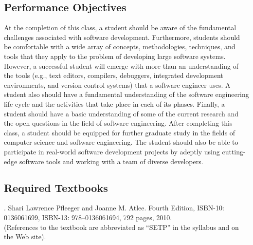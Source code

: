 \documentclass[11pt]{article}
\begin{document}
\subsection*{Performance Objectives}

At the completion of this class, a student should be aware of the fundamental challenges associated with software
development. Furthermore, students should be comfortable with a wide array of concepts, methodologies, techniques, and
tools that they apply to the problem of developing large software systems. However, a successful student will emerge
with more than an understanding of the tools (e.g., text editors, compilers, debuggers, integrated development
environments, and version control systems) that a software engineer uses. A student also should have a fundamental
understanding of the software engineering life cycle and the activities that take place in each of its phases. Finally,
a student should have a basic understanding of some of the current research and the open questions in the field of
software engineering. After completing this class, a student should be equipped for further graduate study in the fields
of computer science and software engineering. The student should also be able to participate in real-world software
development projects by adeptly using cutting-edge software tools and working with a team of diverse developers.

\subsection*{Required Textbooks}


. Shari Lawrence Pfleeger and Joanne M. Atlee.
Fourth Edition, ISBN-10: 0136061699, ISBN-13: 978--0136061694, 792 pages, 2010. \\
(References to the textbook are abbreviated as ``SETP'' in the syllabus and on the Web site).

\end{document}
